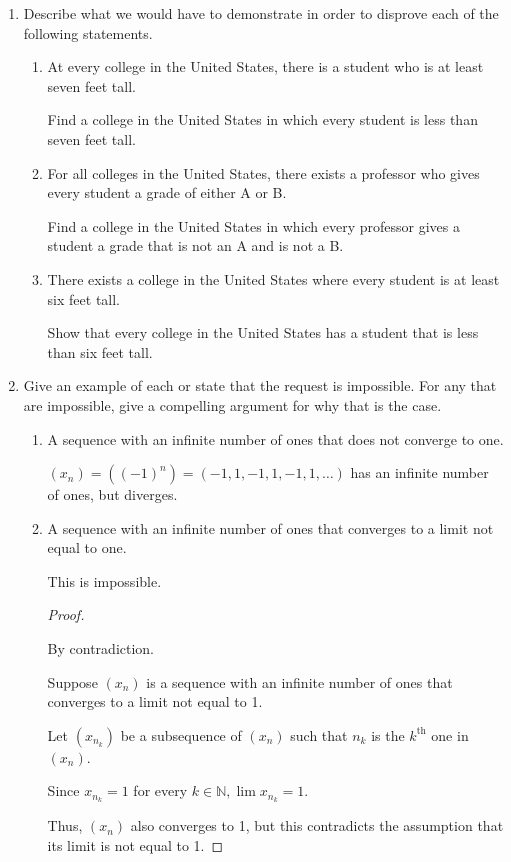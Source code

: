 \documentclass[12pt]{article}
\newcommand{\NN}{\mathbb{N}}
\begin{document}
\begin{enumerate}
\item Describe what we would have to demonstrate in order to disprove each of the following statements.
\begin{enumerate}
\item At every college in the United States, there is a student who is at least seven feet tall.

Find a college in the United States in which every student is less than seven feet tall.

\item For all colleges in the United States, there exists a professor who gives every student a grade of either A or B.

Find a college in the United States in which every professor gives a student a grade that is not an A and is not a B.

\item There exists a college in the United States where every student is at least six feet tall.

Show that every college in the United States has a student that is less than six feet tall.
\end{enumerate}

\item Give an example of each or state that the request is impossible. For any that are impossible, give a compelling argument for why that is the case.
\begin{enumerate}
\item A sequence with an infinite number of ones that does not converge to one.

$(x_n) = ((-1)^n) = (-1, 1, -1, 1, -1, 1, \dots)$ has an infinite number of ones, but diverges.

\item A sequence with an infinite number of ones that converges to a limit not equal to one.

This is impossible.

\begin{proof}
$ $

By contradiction.

Suppose $(x_n)$ is a sequence with an infinite number of ones that converges to a limit not equal to 1.

Let $(x_{n_k})$ be a subsequence of $(x_n)$ such that $n_k$ is the $k^{\text{th}}$ one in $(x_n)$.

Since $x_{n_k} = 1$ for every $k \in \NN, \lim x_{n_k} = 1$.

Thus, $(x_n)$ also converges to 1, but this contradicts the assumption that its limit is not equal to 1.
\end{proof}



\end{enumerate}
\end{enumerate}
\end{document}
